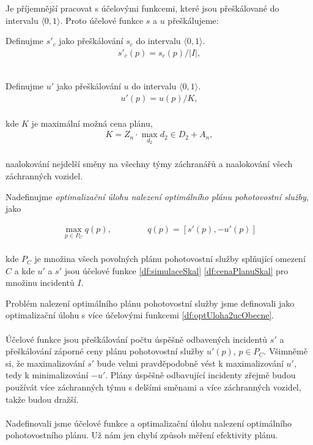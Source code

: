 Je příjemnější pracovat s účelovými funkcemi, které jsou přeškálované do intervalu $\langle 0, 1 \rangle$.
Proto účelové funkce $s$ a $u$ přeškálujeme:

\begin{definice} \label{df:simulaceSkal}
  Definujme $s'_c$ jako přeškálování $s_c$ do intervalu $\langle 0, 1 \rangle$.
  \begin{align*}
    s'_c(p) = s_c(p) / |I|,
  \end{align*}
  \\
\end{definice}

\begin{definice} \label{df:cenaPlanuSkal}
  Definujme $u'$ jako přeškálování $u$ do intervalu $\langle 0, 1 \rangle$.
  \begin{align*}
    u'(p) = u(p) / K,
  \end{align*}
  \\
  kde $K$ je maximální možná cena plánu,
  \begin{align*}
    K = Z_n \cdot \max_{d_2} d_2 \in D_2 + A_n,
  \end{align*}
  \\
  naalokování nejdelší směny na všechny týmy záchranářů a naalokování všech záchranných vozidel.
  \\
\end{definice}

Nadefinujme \textit{optimalizační úlohu nalezení optimálního plánu pohotovostní služby}, jako
\\
\begin{definice}\label{df:optUloha2uc}
  \begin{align*}
    \max_{p \in P_C} q(p), \hspace{50pt} q(p) = [s'(p), -u'(p)]
  \end{align*}
  \\
  kde $P_C$ je množina všech povolných plánu pohotovostní služby splňující omezení $C$
  a kde $u'$ a $s'$ jsou účelové funkce \ref{df:simulaceSkal} \ref{df:cenaPlanuSkal} pro množinu incidentů $I$.
\end{definice}

Problém nalezení optimálního plánu pohotovostní služby jsme definovali jako optimalizační úlohu s více účelovými funkcemi \ref{df:optUloha2ucObecne}.
\\
\\
Účelové funkce jsou přeškálování počtu úspěšně odbavených incidentů $s'$ a přeškálování záporné ceny plánu pohotovostní služby $u'(p)$, $p \in P_C$.
Všimněmě si, že maximalizování $s'$ bude velmi pravděpodobně vést k maximalizování $u'$, tedy k minimalizování $-u'$.
Plány úspěšně odbavující incidenty zřejmě budou používát více záchranných týmu s delšími směnami a více záchranných vozidel, takže budou dražší.
\\
\\
Nadefinovali jsme účelové funkce a optimalizační úlohu nalezení optimálního pohotovostního plánu.
Už nám jen chybí způsob měření efektivity plánu.

